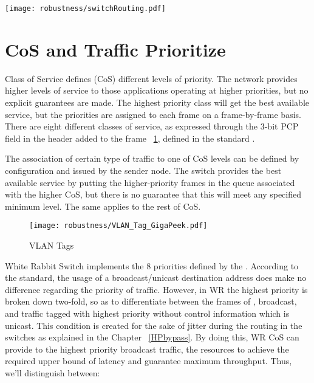 \begin{center}
	\texttt{[image: robustness/switchRouting.pdf]}
	\label{fig:swRouting}
\end{center}

\section{CoS and Traffic Prioritize}
\label{chapter:cos}

Class of Service defines (CoS) different levels of priority. The network
provides higher levels of service to those applications operating at higher
priorities, but no explicit guarantees are made. The highest priority
class will get the best available service, but the priorities are assigned to
each frame on a frame-by-frame basis. There are eight different classes of
service, as expressed through the 3-bit PCP field in the header added to the
frame ~\ref{fig:VLAN_Tag}, defined in the standard \cite{IEEE8021Q}.


The association of certain type of traffic to one of CoS levels can be defined
by configuration and issued by the sender node. The switch provides the best
available service by putting the higher-priority frames in the queue associated
with the higher CoS, but there is no guarantee that this will meet any specified
minimum level. The same applies to the rest of CoS. 

\begin{figure}[!ht]
 \centering
		\texttt{[image: robustness/VLAN\_Tag\_GigaPeek.pdf]}
 \caption{VLAN Tags}
	\label{fig:VLAN_Tag}
\end{figure}


White Rabbit Switch implements the 8 priorities defined by the \cite{IEEE8021Q}.
According to the standard, the usage of a broadcast/unicast destination address
does make no difference regarding the priority of traffic. However, in WR the
highest priority is broken down two-fold, so as to differentiate between the
frames of \ControlMessage, broadcast, and traffic tagged with highest priority
without control information which is unicast. This condition
is created for the sake of jitter during the routing in the
switches as explained in the Chapter ~\ref{HPbypass}. By doing this, WR CoS can
provide to the highest priority broadcast traffic, the resources to
achieve the required upper bound of latency and guarantee maximum throughput.
Thus, we'll distinguish between:

